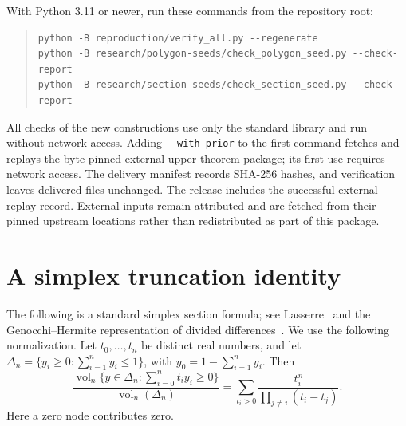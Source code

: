 \documentclass[11pt]{article}
\DeclareMathOperator{\vol}{vol}
\begin{document}
With Python 3.11 or newer, run these commands from the repository root:
\begin{quote}
\small
\begin{verbatim}
python -B reproduction/verify_all.py --regenerate
python -B research/polygon-seeds/check_polygon_seed.py --check-report
python -B research/section-seeds/check_section_seed.py --check-report
\end{verbatim}
\end{quote}
All checks of the new constructions use only the standard library and
run without network access. Adding \texttt{-{}-with-prior} to the first command
fetches and replays the byte-pinned external upper-theorem package;
its first use requires network access. The delivery manifest records
SHA-256 hashes, and verification leaves delivered files unchanged.
The release includes the successful external replay record. External
inputs remain attributed and are fetched from their pinned upstream
locations rather than redistributed as part of this package.

\appendix
\section{A simplex truncation identity}\label{app:truncation}
The following is a standard simplex section formula; see
Lasserre~\cite[Theorem 2.2]{lasserre} and the Genocchi--Hermite
representation of divided differences~\cite[Section 9]{deboor}.
We use the following normalization.
Let $t_0,\ldots,t_n$ be distinct real numbers, and let
$\Delta_n=\{y_i\ge0:\sum_{i=1}^n y_i\le1\}$, with
$y_0=1-\sum_{i=1}^n y_i$. Then
\begin{equation}\label{eq:truncation}
 \frac{\vol_n\{y\in\Delta_n:\sum_{i=0}^n t_i y_i\ge0\}}
      {\vol_n(\Delta_n)}
 =\sum_{t_i>0}\frac{t_i^n}{\prod_{j\ne i}(t_i-t_j)}.
\end{equation}
Here a zero node contributes zero.
\end{document}

